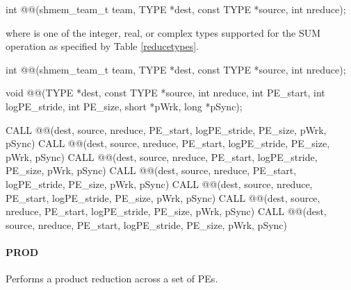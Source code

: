 \begin{apidefinition}
{\color{Green}
\begin{C11synopsis}
int @@(shmem_team_t team, TYPE *dest, const TYPE *source, int nreduce);
\end{C11synopsis}
where \TYPE{} is one of the integer, real, or complex types supported for the SUM operation as specified by Table \ref{reducetypes}.
}

\begin{Csynopsis}
\end{Csynopsis}
{\color{Green}
\begin{CsynopsisCol}
int @@(shmem_team_t team, TYPE *dest, const TYPE *source, int nreduce);
\end{CsynopsisCol}
}
\begin{DeprecateBlock}
\begin{CsynopsisCol}
void @@(TYPE *dest, const TYPE *source, int nreduce, int PE_start, int logPE_stride, int PE_size, short *pWrk, long *pSync);
\end{CsynopsisCol}
\end{DeprecateBlock}

\begin{Fsynopsis}
CALL @@(dest, source, nreduce, PE_start, logPE_stride, PE_size, pWrk, pSync)
CALL @@(dest, source, nreduce, PE_start, logPE_stride, PE_size, pWrk, pSync)
CALL @@(dest, source, nreduce, PE_start, logPE_stride, PE_size, pWrk, pSync)
CALL @@(dest, source, nreduce, PE_start, logPE_stride, PE_size, pWrk, pSync)
CALL @@(dest, source, nreduce, PE_start, logPE_stride, PE_size, pWrk, pSync)
CALL @@(dest, source, nreduce, PE_start, logPE_stride, PE_size, pWrk, pSync)
CALL @@(dest, source, nreduce, PE_start, logPE_stride, PE_size, pWrk, pSync)
\end{Fsynopsis}

\paragraph{PROD}
Performs a product reduction across a set of \acp{PE}.\newline


\end{apidefinition}
